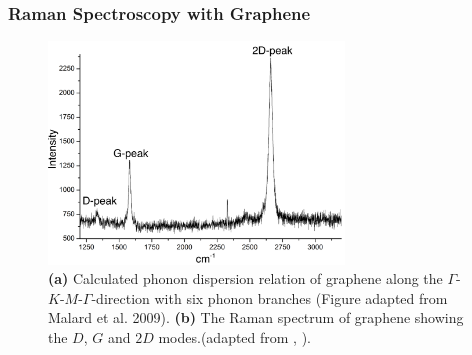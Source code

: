 \subsubsection{Raman Spectroscopy with Graphene}

\begin{figure}[!h]
  \centering
  \includegraphics[width=0.7\textwidth]{./images/graphene-raman.png}
  \caption{\textbf{(a)} Calculated phonon dispersion relation of graphene along the $\Gamma$-$K$-$M$-$\Gamma$-direction with six phonon branches (Figure adapted from Malard et al. 2009\mcite). \textbf{(b)} The Raman spectrum of graphene showing the $D$, $G$ and $2D$ modes.(adapted from \mcite, ).}
\end{figure}


